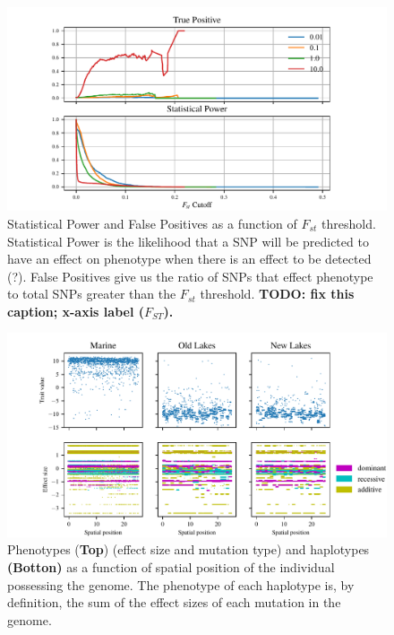 \documentclass{article}
\begin{document}
\begin{figure}
	\begin{center}
		\includegraphics{Final_Plots/True_Power_0_5_500.pdf}
  		\caption{ 
		Statistical Power and False Positives as a function of $F_{st}$ threshold. 
		Statistical Power is the likelihood that a SNP will be predicted to have an effect on phenotype when there is an effect to be detected (?).
		False Positives give us the ratio of SNPs that effect phenotype to total SNPs greater than the $F_{st}$ threshold.
            \textbf{
                TODO: fix this caption; x-axis label ($F_{ST}$).}
		}
  		\label{fig:Power_FP_5lakes}
	\end{center}
\end{figure}

\begin{figure}
	\begin{center}
  		\includegraphics[width=1.0\linewidth]{Final_Plots/Haplo_small.pdf}
  		\caption{
			Phenotypes (\textbf{Top}) (effect size and mutation type) and haplotypes \textbf{(Botton)} as a function of spatial position of the individual 
			possessing the genome. The phenotype of each haplotype is, by definition, the sum of the 
			effect sizes of each mutation in the genome. 
		}
  		\label{fig:Haplo_Pheno}
	\end{center}
\end{figure}
\end{document}

